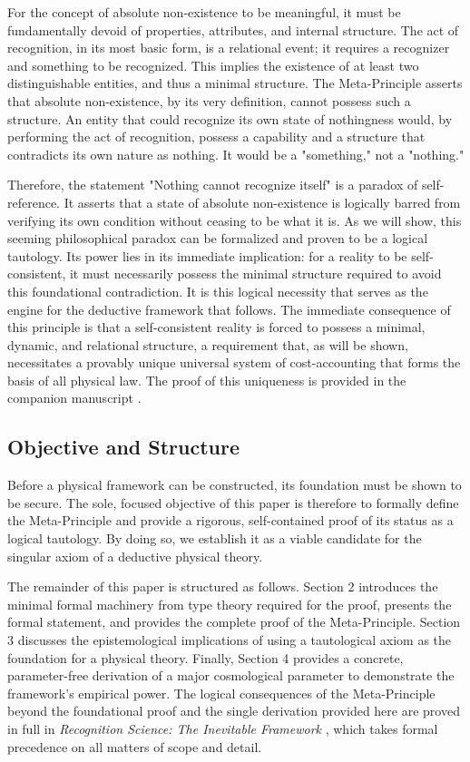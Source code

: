 \documentclass[axioms,article,submit,pdftex,oneauthor]{Definitions/mdpi}
\begin{document}
For the concept of absolute non-existence to be meaningful, it must be fundamentally devoid of properties, attributes, and internal structure. The act of recognition, in its most basic form, is a relational event; it requires a recognizer and something to be recognized. This implies the existence of at least two distinguishable entities, and thus a minimal structure. The Meta-Principle asserts that absolute non-existence, by its very definition, cannot possess such a structure. An entity that could recognize its own state of nothingness would, by performing the act of recognition, possess a capability and a structure that contradicts its own nature as nothing. It would be a "something," not a "nothing."

Therefore, the statement "Nothing cannot recognize itself" is a paradox of self-reference. It asserts that a state of absolute non-existence is logically barred from verifying its own condition without ceasing to be what it is. As we will show, this seeming philosophical paradox can be formalized and proven to be a logical tautology. Its power lies in its immediate implication: for a reality to be self-consistent, it must necessarily possess the minimal structure required to avoid this foundational contradiction. It is this logical necessity that serves as the engine for the deductive framework that follows. The immediate consequence of this principle is that a self-consistent reality is forced to possess a minimal, dynamic, and relational structure, a requirement that, as will be shown, necessitates a provably unique universal system of cost-accounting that forms the basis of all physical law. The proof of this uniqueness is provided in the companion manuscript \cite{washburn2025zenodo}.

\subsection{Objective and Structure}
Before a physical framework can be constructed, its foundation must be shown to be secure. The sole, focused objective of this paper is therefore to formally define the Meta-Principle and provide a rigorous, self-contained proof of its status as a logical tautology. By doing so, we establish it as a viable candidate for the singular axiom of a deductive physical theory.

The remainder of this paper is structured as follows. Section 2 introduces the minimal formal machinery from type theory required for the proof, presents the formal statement, and provides the complete proof of the Meta-Principle. Section 3 discusses the epistemological implications of using a tautological axiom as the foundation for a physical theory. Finally, Section 4 provides a concrete, parameter-free derivation of a major cosmological parameter to demonstrate the framework's empirical power. The logical consequences of the Meta-Principle beyond the foundational proof and the single derivation provided here are proved in full in \textit{Recognition Science: The Inevitable Framework} \cite{washburn2025zenodo}, which takes formal precedence on all matters of scope and detail.
\end{document}
